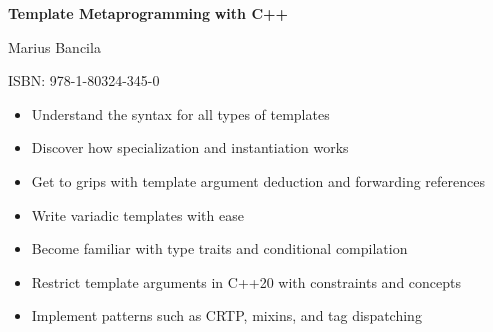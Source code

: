 
\textbf{Template Metaprogramming} \textbf{with C++}

Marius Bancila

ISBN: 978-1-80324-345-0

\begin{itemize}
\item
  Understand the syntax for all types of templates
\item
  Discover how specialization and instantiation works
\item
  Get to grips with template argument deduction and forwarding references
\item
  Write variadic templates with ease
\item
  Become familiar with type traits and conditional compilation
\item
  Restrict template arguments in C++20 with constraints and concepts
\item
  Implement patterns such as CRTP, mixins, and tag dispatching
\end{itemize}

